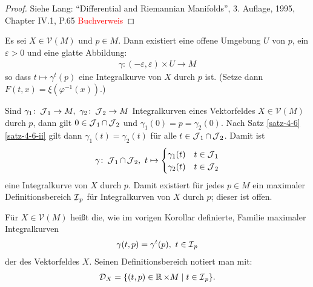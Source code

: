 \begin{proof}
  Siehe Lang: "`Differential and Riemannian Manifolds"', 3. Auflage, 1995, Chapter IV.1, P.65 \textcolor{red}{Buchverweis}
\end{proof}

\begin{Kor}\label{korollar-4-7}
  Es sei $X \in \mathcal V(M)$ und $p \in M$. Dann existiert eine offene Umgebung $U$ von $p$, ein $\varepsilon > 0$ und eine glatte Abbildung:
  \begin{align*}
    \gamma\colon(-\varepsilon,\varepsilon) \times U \to M
  \end{align*}
  so dass $t \mapsto \gamma^t(p)$ eine Integralkurve von $X$ durch $p$ ist. (Setze dann $F(t,x) = \xi(\varphi^{-1}(x))$.)
\end{Kor}

\begin{Kor}\label{korollar-4-8}
  Sind $\gamma_1 \colon \operatorname{\mathcal{J}}_1 \to M, \ \gamma_2 \colon \operatorname{\mathcal{J}}_2 \to M$ Integralkurven eines Vektorfeldes $X \in \mathcal V(M)$ durch $p$, dann gilt $0 \in \operatorname{\mathcal{J}}_1 \cap \operatorname{\mathcal{J}}_2$ und $\gamma_1(0)= p = \gamma_2(0)$.
  Nach Satz \ref{satz-4-6} \ref{satz-4-6-ii} gilt dann $\gamma_1(t) = \gamma_2(t)$ für alle $t \in \operatorname{\mathcal{J}}_1 \cap \operatorname{\mathcal{J}}_2$. Damit ist
  \begin{align*}
    \gamma \colon \operatorname{\mathcal{J}}_1 \cap \operatorname{\mathcal{J}}_2, \ t \mapsto 
    \begin{cases}
      \gamma_1(t) & t \in \operatorname{\mathcal{J}}_1\\
      \gamma_2(t) & t \in \operatorname{\mathcal{J}}_2
    \end{cases}
  \end{align*}
  eine Integralkurve von $X$ durch $p$.
  Damit existiert für jedes $p \in M$ ein maximaler Definitionsbereich $\operatorname{\mathcal{I}}_p$ für Integralkurven von $X$ durch $p$; dieser ist offen.
\end{Kor}

\begin{dfn}
  Für $X \in \mathcal V(M)$ heißt die, wie im vorigen Korollar definierte, Familie maximaler Integralkurven
  \begin{align*}
    \gamma(t,p) = \gamma^t(p),\ t \in \operatorname{\mathcal{I}}_p
  \end{align*}
  der  des Vektorfeldes $X$.
  Seinen Definitionsbereich notiert man mit:
  \begin{align*}
    \mathcal D_X = \{(t,p) \in \operatorname{\mathbb{R}} \times M \mid t \in \operatorname{\mathcal{I}}_p\}.
  \end{align*}
\end{dfn}

